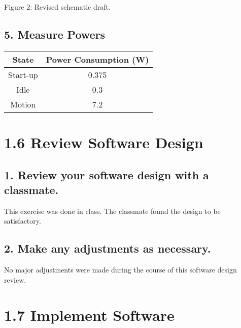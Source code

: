 \documentclass{article}
\begin{document}
\clearpage

\begin{figure}


\end{figure}
Figure 2: Revised schematic draft.

\clearpage

\subsection*{5. Measure Powers}
\begin{tabular}{|c|c|}
  \hline
  State & Power Consumption (W)\\\hline\hline
  Start-up & 0.375 \\\hline
  Idle &  0.3 \\\hline
  Motion & 7.2 \\\hline

\end{tabular}


\section*{1.6 Review Software Design}

\subsection*{1. Review your software design with a classmate.}

This exercise was done in class.  The classmate found the design to be satisfactory.

\subsection*{2.  Make any adjustments as necessary.}

No major adjustments were made during the course of this software design review.


\section*{1.7 Implement Software}
\end{document}
